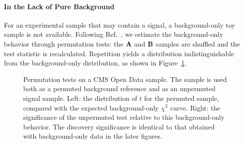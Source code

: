 \documentclass[paper/ddppaper2.tex]{subfiles}
\begin{document}
\paragraph{In the Lack of Pure Background}

For an experimental sample that may contain a signal, a background-only toy sample is not available. Following Ref.~\cite{LastDDPPaper}, we estimate the background-only behavior through permutation tests: the ${\mathbf{A}}$ and ${\mathbf{B}}$ samples are shuffled and the test statistic is recalculated. Repetition yields a distribution indistinguishable from the background-only distribution, as shown in Figure~\ref{fig:permutation_test}.

\begin{figure}
    \centering
    \begin{minipage}{0.48\linewidth}
    \end{minipage}
    \hfill
    \begin{minipage}{0.48\linewidth}
    \end{minipage}
    \caption{Permutation tests on a CMS Open Data sample. The sample is used both as a permuted background reference and as an unpermuted signal sample. Left: the distribution of $t$ for the permuted sample, compared with the expected background-only $\chi^2$ curve. Right: the significance of the unpermuted test relative to this background-only behavior. The discovery significance is identical to that obtained with background-only data in the later figures.}
    \label{fig:permutation_test}
\end{figure}
\end{document}
